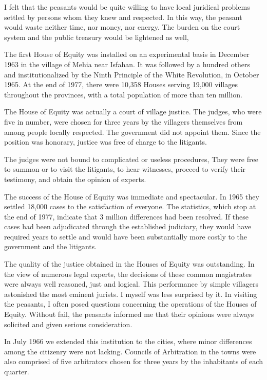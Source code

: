 I felt that the peasants would be quite willing to have local juridical problems settled by persons whom they knew and respected. In this way, the peasant would waste neither time, nor money, nor energy. The burden on the court system and the public treasury would be lightened as well, 

The first House of Equity was installed on an experimental basis in December 1963 in the village of Mehia near Isfahan. It was followed by a hundred others and institutionalized by the Ninth Principle of the White Revolution, in October 1965. At the end of 1977, there were 10,358 Houses serving 19,000 villages throughout the provinces, with a total population of more than ten million. 

The House of Equity was actually a court of village justice. The judges, who were five in number, were chosen for three years by the villagers themselves from among people locally respected. The government did not appoint them. Since the position was honorary, justice was free of charge to the litigants. 

The judges were not bound to complicated or useless procedures, They were free to summon or to visit the litigants, to hear witnesses, proceed to verify their testimony, and obtain the opinion of experts. 

The success of the House of Equity was immediate and spectacular. In 1965 they settled 18,000 cases to the satisfaction of everyone. The statistics, which stop at the end of 1977, indicate that 3 million differences had been resolved. If these cases had been adjudicated through the established judiciary, they would have required years to settle and would have been substantially more costly to the government and the litigants. 

The quality of the justice obtained in the Houses of Equity was outstanding. In the view of numerous legal experts, the decisions of these common magistrates were always well reasoned, just and logical. This performance by simple villagers astonished the most eminent jurists. I myself was less surprised by it. In visiting the peasants, I often posed questions concerning the operations of the Houses of Equity. Without fail, the peasants informed me that their opinions were always solicited and given serious consideration. 

In July 1966 we extended this institution to the cities, where minor differences among the citizenry were not lacking. Councils of Arbitration in the towns were also comprised of five arbitrators chosen for three years by the inhabitants of each quarter. 

